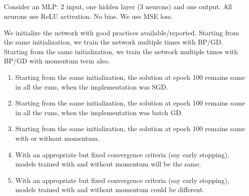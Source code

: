 \begin{frame}
\section{}
Consider an MLP: 2 input, one hidden  layer (3 neurons) and one output. All neurons use ReLU activation. No bias. We use MSE loss.

We initialize the network with good practices available/reported. Starting from the same initialization,  we train the network multiple times with BP/GD. Starting from the same initialization,  we train the network multiple times with BP/GD with momentum term also.

\begin{enumerate}[label=(\Alph*)]
\item Starting from the same initialization, the solution at epoch 100 remains same in all the runs, when the implementation was SGD.
\item Starting from the same initialization, the solution at epoch 100 remains same in all the runs, when the implementation was batch GD.    %
\item Starting from the same initialization, the solution at epoch 100 remains same with or without momentum.
\item With an appropriate but fixed convergence criteria (say early stopping), models trained with and without momentum will be the same.
\item With an appropriate but fixed convergence criteria (say early stopping), models trained with and without momentum could be different.   %
\end{enumerate}
\end{frame}
